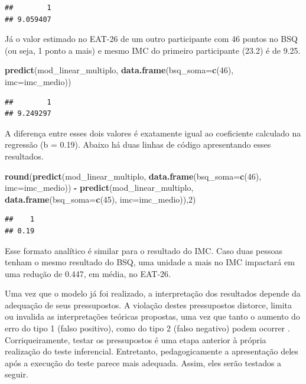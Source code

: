 \documentclass[
]{book}
\newenvironment{Shaded}{\begin{snugshade}}{\end{snugshade}}
\newcommand{\DataTypeTok}[1]{\textcolor[rgb]{0.13,0.29,0.53}{#1}}
\newcommand{\DecValTok}[1]{\textcolor[rgb]{0.00,0.00,0.81}{#1}}
\newcommand{\KeywordTok}[1]{\textcolor[rgb]{0.13,0.29,0.53}{\textbf{#1}}}
\newcommand{\NormalTok}[1]{#1}
\newcommand{\OperatorTok}[1]{\textcolor[rgb]{0.81,0.36,0.00}{\textbf{#1}}}
\newcommand{\StringTok}[1]{\textcolor[rgb]{0.31,0.60,0.02}{#1}}
\begin{document}
\begin{verbatim}
##        1 
## 9.059407
\end{verbatim}

Já o valor estimado no EAT-26 de um outro participante com 46 pontos no BSQ (ou seja, 1 ponto a mais) e mesmo IMC do primeiro participante (23.2) é de 9.25.

\begin{Shaded}
\begin{Highlighting}[]
\KeywordTok{predict}\NormalTok{(mod_linear_multiplo, }\KeywordTok{data.frame}\NormalTok{(}\DataTypeTok{bsq_soma=}\KeywordTok{c}\NormalTok{(}\DecValTok{46}\NormalTok{), }
                                        \DataTypeTok{imc=}\NormalTok{imc_medio))}
\end{Highlighting}
\end{Shaded}

\begin{verbatim}
##        1 
## 9.249297
\end{verbatim}

A diferença entre esses dois valores é exatamente igual ao coeficiente calculado na regressão (b = 0.19). Abaixo há duas linhas de código apresentando esses resultados.

\begin{Shaded}
\begin{Highlighting}[]
\KeywordTok{round}\NormalTok{(}\KeywordTok{predict}\NormalTok{(mod_linear_multiplo, }\KeywordTok{data.frame}\NormalTok{(}\DataTypeTok{bsq_soma=}\KeywordTok{c}\NormalTok{(}\DecValTok{46}\NormalTok{), }
                                              \DataTypeTok{imc=}\NormalTok{imc_medio)) }\OperatorTok{-}\StringTok{ }
\StringTok{        }\KeywordTok{predict}\NormalTok{(mod_linear_multiplo, }\KeywordTok{data.frame}\NormalTok{(}\DataTypeTok{bsq_soma=}\KeywordTok{c}\NormalTok{(}\DecValTok{45}\NormalTok{), }
                                                \DataTypeTok{imc=}\NormalTok{imc_medio)),}\DecValTok{2}\NormalTok{)}
\end{Highlighting}
\end{Shaded}

\begin{verbatim}
##    1 
## 0.19
\end{verbatim}

Esse formato analítico é similar para o resultado do IMC. Caso duas pessoas tenham o mesmo resultado do BSQ, uma unidade a mais no IMC impactará em uma redução de 0.447, em média, no EAT-26.

Uma vez que o modelo já foi realizado, a interpretação dos resultados depende da adequação de seus pressupostos. A violação destes pressupostos distorce, limita ou invalida as interpretações teóricas propostas, uma vez que tanto o aumento do erro do tipo 1 (falso positivo), como do tipo 2 (falso negativo) podem ocorrer \citep{Lix1996, Barker2015, Ernst2017}. Corriqueiramente, testar os pressupostos é uma etapa anterior à própria realização do teste inferencial. Entretanto, pedagogicamente a apresentação deles após a execução do teste parece mais adequada. Assim, eles serão testados a seguir.
\end{document}
